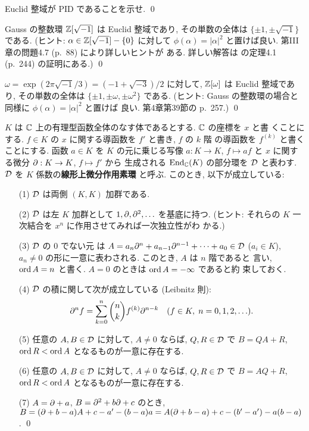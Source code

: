 \documentclass[12pt,twoside]{jarticle}
\begin{document}
\begin{question}
  Euclid 整域が PID であることを示せ. \qed
\end{question}

\begin{question}
  Gauss の整数環 ${\mathbb Z}[\sqrt{-1}]$ は Euclid 整域であり,
  その単数の全体は $\{\pm 1,\pm\sqrt{-1}\}$ である.
  (ヒント: $\alpha\in{\mathbb Z}[\sqrt{-1}]-\{0\}$ に対して $\phi(\alpha)=|\alpha|^2$ 
  と置けば良い. \cite{morita} 第III章の問題4.7 (p.~88) により詳しいヒントが
  ある.  詳しい解答は \cite{takagi1} の定理4.1 (p.~244) の証明にある.)
  \qed
\end{question}

\begin{question}
  $\omega=\exp(2\pi\sqrt{-1}/3)=(-1+\sqrt{-3})/2$ に対して,
  ${\mathbb Z}[\omega]$ は Euclid 整域であり,
  その単数の全体は $\{\pm 1,\pm\omega, \pm\omega^2\}$ である.
  (ヒント: Gauss の整数環の場合と同様に $\phi(\alpha)=|\alpha|^2$ と置けば
  良い. \cite{takagi1} 第4章第39節の p.~257.) \qed
\end{question}

\begin{question}\label{q:D-is-noncomm-PID}
  $K$ は ${\mathbb C}$ 上の有理型函数全体のなす体であるとする. ${\mathbb C}$ の座標を $x$ と書
  くことにする. $f\in K$ の $x$ に関する導函数を $f'$ と書き, $f$ の $k$ 階
  の導函数を $f^{(k)}$ と書くことにする. 
  函数 $a\in K$ を $K$ の元に乗じる写像 $a:K\to K$, $f\mapsto af$ 
  と $x$ に関する微分 $\partial:K\to K$,  $f\mapsto f'$ から
  生成される $\mathop{\mathrm{End}}\nolimits_{\mathbb C}(K)$ の部分環を ${\mathcal D}$ と表わす. 
  ${\mathcal D}$ を $K$ 係数の{\bf 線形上微分作用素環} と呼ぶ. 
  このとき, 以下が成立している:
  \begin{itemize}
  \item[(1)] ${\mathcal D}$ は両側 $(K,K)$ 加群である.
  \item[(2)] ${\mathcal D}$ は左 $K$ 加群として $1,\partial,\partial^2,\ldots$ を基底に持つ.
    (ヒント: それらの $K$ 一次結合を $x^n$ に作用させてみれば一次独立性がわ
    かる.)
  \item[(3)] ${\mathcal D}$ の $0$ でない元
    は $A=a_n\partial^n+a_{n-1}\partial^{n-1}+\cdots+a_0\in{\mathcal D}$ ($a_i\in K$), $a_n\ne0$ 
    の形に一意に表わされる. このとき, $A$ は $n$ 階であると
    言い, $\mathop{\mathrm{ord}}\nolimits A = n$ と書く. $A=0$ のときは $\mathop{\mathrm{ord}}\nolimits A = -\infty$ であると約
    束しておく.
  \item[(4)] ${\mathcal D}$ の積に関して次が成立している (Leibnitz 則):
    \begin{equation*}
      \partial^n f = \sum_{k=0}^n \binom{n}{k} f^{(k)} \partial^{n-k}
      \quad (f\in K,\; n=0,1,2,\ldots).
    \end{equation*}
  \item[(5)] 任意の $A,B\in{\mathcal D}$ に対して, $A\ne 0$ ならば,
    $Q,R\in{\mathcal D}$ で $B=QA+R$, $\mathop{\mathrm{ord}}\nolimits R < \mathop{\mathrm{ord}}\nolimits A$ となるものが一意に存在する.
  \item[(6)] 任意の $A,B\in{\mathcal D}$ に対して, $A\ne 0$ ならば,
    $Q,R\in{\mathcal D}$ で $B=AQ+R$, $\mathop{\mathrm{ord}}\nolimits R < \mathop{\mathrm{ord}}\nolimits A$ となるものが一意に存在する.
  \item[(7)] $A=\partial + a$, $B=\partial^2 + b\partial + c$ のとき, 
    $B = (\partial + b - a)A + c-a'-(b-a)a = A(\partial + b - a) + c-(b'-a')-a(b-a)$.
    \qed
  \end{itemize}
\end{question}
\end{document}
